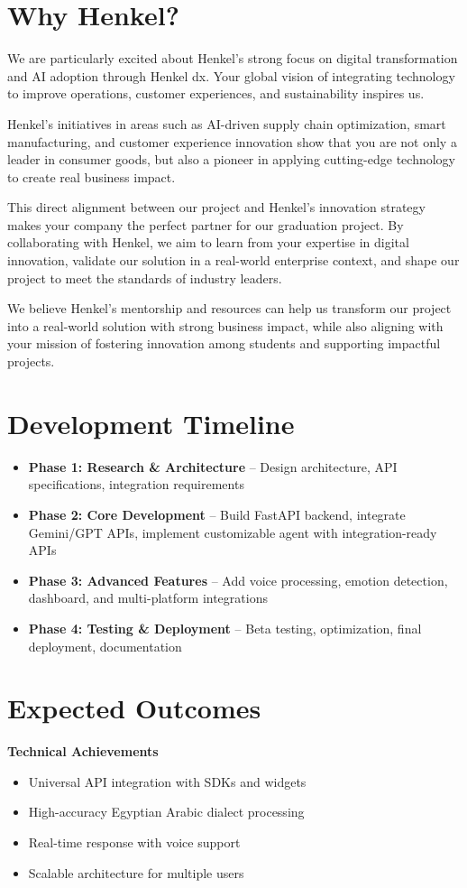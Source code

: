 \documentclass[12pt,a4paper]{article}
\begin{document}
\section*{Why Henkel?}
We are particularly excited about Henkel’s strong focus on digital transformation and AI adoption through Henkel dx. Your global vision of integrating technology to improve operations, customer experiences, and sustainability inspires us.  

Henkel’s initiatives in areas such as AI-driven supply chain optimization, smart manufacturing, and customer experience innovation show that you are not only a leader in consumer goods, but also a pioneer in applying cutting-edge technology to create real business impact.  

This direct alignment between our project and Henkel’s innovation strategy makes your company the perfect partner for our graduation project. By collaborating with Henkel, we aim to learn from your expertise in digital innovation, validate our solution in a real-world enterprise context, and shape our project to meet the standards of industry leaders.  

We believe Henkel’s mentorship and resources can help us transform our project into a real-world solution with strong business impact, while also aligning with your mission of fostering innovation among students and supporting impactful projects.

\section*{Development Timeline}
\begin{itemize}
    \item \textbf{Phase 1: Research \& Architecture} – Design architecture, API specifications, integration requirements
    \item \textbf{Phase 2: Core Development} – Build FastAPI backend, integrate Gemini/GPT APIs, implement customizable agent with integration-ready APIs
    \item \textbf{Phase 3: Advanced Features } – Add voice processing, emotion detection, dashboard, and multi-platform integrations
    \item \textbf{Phase 4: Testing \& Deployment} – Beta testing, optimization, final deployment, documentation
\end{itemize}

\section*{Expected Outcomes}
\textbf{Technical Achievements}
\begin{itemize}
    \item Universal API integration with SDKs and widgets
    \item High-accuracy Egyptian Arabic dialect processing
    \item Real-time response with voice support
    \item Scalable architecture for multiple users
\end{itemize}
\end{document}
